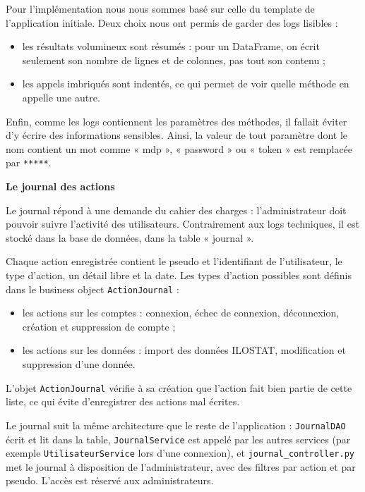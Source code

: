 \documentclass[
  french,
  12pt,
  letterpaper,
  DIV=11,
  numbers=noendperiod]{scrartcl}
\providecommand{\tightlist}{%
  \setlength{\itemsep}{0pt}\setlength{\parskip}{0pt}}
\begin{document}
Pour l'implémentation nous nous sommes basé sur celle du template de
l'application initiale. Deux choix nous ont permis de garder des logs
lisibles :

\begin{itemize}
\tightlist
\item
  les résultats volumineux sont résumés : pour un DataFrame, on écrit
  seulement son nombre de lignes et de colonnes, pas tout son contenu ;
\item
  les appels imbriqués sont indentés, ce qui permet de voir quelle
  méthode en appelle une autre.
\end{itemize}

Enfin, comme les logs contiennent les paramètres des méthodes, il
fallait éviter d'y écrire des informations sensibles. Ainsi, la valeur
de tout paramètre dont le nom contient un mot comme « mdp », « password
» ou « token » est remplacée par \texttt{*****}.

\textbf{Le journal des actions}

Le journal répond à une demande du cahier des charges : l'administrateur
doit pouvoir suivre l'activité des utilisateurs. Contrairement aux logs
techniques, il est stocké dans la base de données, dans la table «
journal ».

Chaque action enregistrée contient le pseudo et l'identifiant de
l'utilisateur, le type d'action, un détail libre et la date. Les types
d'action possibles sont définis dans le business object
\texttt{ActionJournal} :

\begin{itemize}
\tightlist
\item
  les actions sur les comptes : connexion, échec de connexion,
  déconnexion, création et suppression de compte ;
\item
  les actions sur les données : import des données ILOSTAT, modification
  et suppression d'une donnée.
\end{itemize}

L'objet \texttt{ActionJournal} vérifie à sa création que l'action fait
bien partie de cette liste, ce qui évite d'enregistrer des actions mal
écrites.

Le journal suit la même architecture que le reste de l'application :
\texttt{JournalDAO} écrit et lit dans la table, \texttt{JournalService}
est appelé par les autres services (par exemple
\texttt{UtilisateurService} lors d'une connexion), et
\texttt{journal\_controller.py} met le journal à disposition de
l'administrateur, avec des filtres par action et par pseudo. L'accès est
réservé aux administrateurs.
\end{document}
